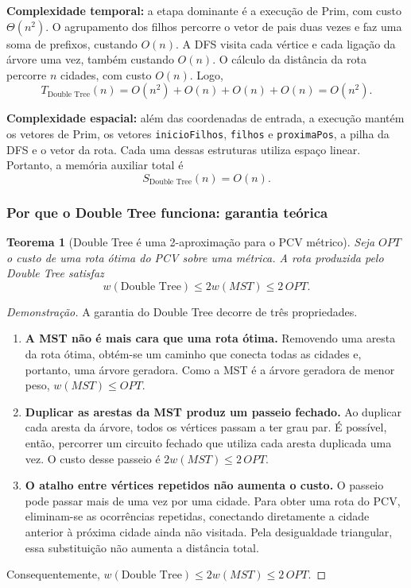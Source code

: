 \documentclass[11pt,a4paper]{article}
\renewcommand{\_}{\underscoreoriginal\allowbreak}
\newtheorem*{teorema}{Teorema}
\begin{document}
\textbf{Complexidade temporal:} a etapa dominante é a execução de Prim,
com custo $\Theta(n^2)$. O agrupamento dos filhos percorre o vetor de
pais duas vezes e faz uma soma de prefixos, custando $O(n)$. A DFS visita cada vértice e cada ligação
da árvore uma vez, também custando $O(n)$. O cálculo da distância da
rota percorre $n$ cidades, com custo $O(n)$. Logo,
\[
  T_{\text{Double Tree}}(n) = O(n^2)+O(n)+O(n)+O(n) = O(n^2).
\]

\textbf{Complexidade espacial:} além das coordenadas de entrada, a
execução mantém os vetores de Prim, os vetores \texttt{inicioFilhos},
\texttt{filhos} e \texttt{proximaPos}, a pilha da DFS e o vetor da
rota. Cada uma dessas estruturas utiliza espaço linear.
Portanto, a memória auxiliar total é
\[
  S_{\text{Double Tree}}(n)=O(n).
\]

\subsubsection*{Por que o Double Tree funciona: garantia teórica}

\begin{teorema}[Double Tree é uma 2-aproximação para o PCV métrico]
Seja $OPT$ o custo de uma rota ótima do PCV sobre uma métrica. A rota
produzida pelo Double Tree satisfaz
\[
  w(\text{Double Tree})\leq 2w(MST)\leq 2\,OPT.
\]
\end{teorema}
\begin{proof}[Demonstração]
A garantia do Double Tree decorre de três propriedades.

\begin{enumerate}
  \item \textbf{A MST não é mais cara que uma rota ótima.} Removendo uma
    aresta da rota ótima, obtém-se um caminho que conecta todas as
    cidades e, portanto, uma árvore geradora. Como a MST é a árvore
    geradora de menor peso, $w(MST)\leq OPT$.
  \item \textbf{Duplicar as arestas da MST produz um passeio fechado.} Ao
    duplicar cada aresta da árvore, todos os vértices passam a ter grau
    par. É possível, então, percorrer um circuito fechado que utiliza
    cada aresta duplicada uma vez. O custo desse passeio é
    $2w(MST)\leq 2\,OPT$.
  \item \textbf{O atalho entre vértices repetidos não aumenta o custo.}
    O passeio pode passar mais de uma vez por uma cidade. Para obter uma
    rota do PCV, eliminam-se as ocorrências repetidas, conectando
    diretamente a cidade anterior à próxima cidade ainda não visitada.
    Pela desigualdade triangular, essa substituição não aumenta a
    distância total.
\end{enumerate}
Consequentemente, $w(\text{Double Tree})\leq 2w(MST)\leq 2\,OPT$.
\end{proof}
\end{document}
